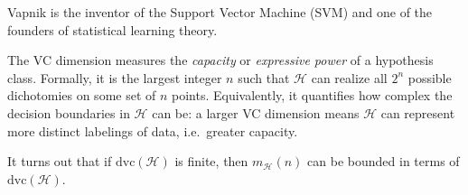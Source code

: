 \documentclass[../main]{subfiles}
\begin{document}
\begin{remark}
Vapnik is the inventor of the Support Vector Machine (SVM) and one of the founders of
statistical learning theory.
\end{remark}

The VC dimension measures the \emph{capacity} or \emph{expressive power} of a hypothesis class.
Formally, it is the largest integer $n$ such that $\mathcal{H}$ can realize all
$2^n$ possible dichotomies on some set of $n$ points.
Equivalently, it quantifies how complex the decision boundaries in $\mathcal{H}$ can be:
a larger VC dimension means $\mathcal{H}$ can represent more distinct labelings of data,
i.e.\ greater capacity.

\smallskip
It turns out that if $\mathrm{dvc}(\mathcal{H})$ is finite,
then $m_{\mathcal{H}}(n)$ can be bounded in terms of $\mathrm{dvc}(\mathcal{H})$.
\end{document}
